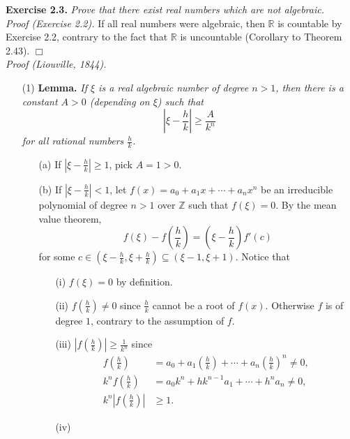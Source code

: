 \documentclass{article}
\begin{document}



\textbf{Exercise 2.3.}
\emph{Prove that there exist real numbers which are not algebraic.} \\

\emph{Proof (Exercise 2.2).}
If all real numbers were algebraic, then $\mathbb{R}$ is countable by Exercise 2.2,
contrary to the fact that
$\mathbb{R}$ is uncountable (Corollary to Theorem 2.43).
$\Box$ \\

\emph{Proof (Liouville, 1844).}
\begin{enumerate}
\item[(1)]
\textbf{Lemma.}
\emph{If $\xi$ is a real algebraic number of degree $n > 1$,
then there is a constant $A > 0$ (depending on $\xi$) such that
$$\left| \xi - \frac{h}{k} \right| \geq \frac{A}{k^n}$$
for all rational numbers $\frac{h}{k}$.}
\begin{enumerate}
\item[(a)]
If $\left| \xi - \frac{h}{k} \right| \geq 1$, pick $A = 1 > 0$.
\item[(b)]
If $\left| \xi - \frac{h}{k} \right| < 1$,
let $f(x) = a_0 + a_1 x + \cdots + a_n x^n$
be an irreducible polynomial of degree $n > 1$ over $\mathbb{Z}$ such that
$f(\xi) = 0$.
By the mean value theorem,
$$f(\xi) - f\left( \frac{h}{k} \right)
= \left( \xi - \frac{h}{k} \right) f'(c)$$
for some
$c
\in \left( \xi - \frac{h}{k}, \xi + \frac{h}{k} \right)
\subseteq (\xi - 1, \xi + 1)$.
Notice that
\begin{enumerate}
\item[(i)]
$f(\xi) = 0$ by definition.
\item[(ii)]
$f\left( \frac{h}{k} \right) \neq 0$ since $\frac{h}{k}$ cannot be a root of $f(x)$.
Otherwise $f$ is of degree $1$, contrary to the assumption of $f$.
\item[(iii)]
$\left| f\left( \frac{h}{k} \right) \right| \geq \frac{1}{k^n}$
since
\begin{align*}
  f\left( \frac{h}{k} \right)
  &= a_0 + a_1 \left( \frac{h}{k} \right) + \cdots + a_n \left( \frac{h}{k} \right)^n
  \neq 0, \\
  k^n f\left( \frac{h}{k} \right)
  &= a_0 k^n + h k^{n-1} a_1 + \cdots + h^n a_n
  \neq 0, \\
  k^n \left| f\left( \frac{h}{k} \right) \right|
  &\geq 1.
\end{align*}
\item[(iv)]

\end{enumerate}
\end{enumerate}
\end{enumerate}
\end{document}
